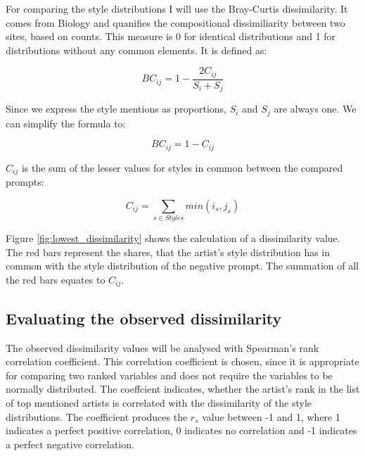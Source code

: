 






For comparing the style distributions I will use the Bray-Curtis dissimilarity. It comes from Biology and quanifies the compositional dissimiliarity between two sites, based on counts. This measure is 0 for identical distributions and 1 for distributions without any common elements. It is defined as:

\[ BC_{ij} = 1 - \frac{2C_{ij}}{S_i + S_j}\]

Since we express the style mentions as proportions, \(S_i\) and \(S_j\) are always one. We can simplify the formula to:

\[ BC_{ij} = 1 - C_{ij} \]


\(C_{ij}\) is the sum of the lesser values for styles in common between the compared prompts:

\[ C_{ij} = \sum_{s \in Styles} min(i_s,j_s)\]

Figure \ref{fig:lowest_dissimilarity} shows the calculation of a dissimilarity value. The red bars represent the shares, that the artist's style distribution has in common with the style distribution of the negative prompt. The summation of all the red bars equates to \(C_{ij}\). 

\subsection{Evaluating the observed dissimilarity}

The observed dissimilarity values will be analysed with Spearman's rank correlation coefficient. This correlation coefficient is chosen, since it is appropriate for comparing two ranked variables and does not require the variables to be normally distributed. The coeffcient indicates, whether the artist's rank in the list of top mentioned artists is correlated with the dissimilarity of the style distributions. The coefficient produces the \(r_s\) value between -1 and 1, where 1 indicates a perfect positive correlation, 0 indicates no correlation and -1 indicates a perfect negative correlation.

